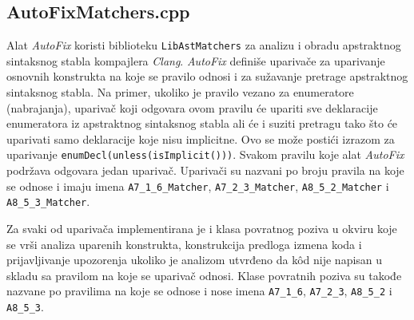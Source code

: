 \documentclass[12pt,oneside]{memoir}
\begin{document}
\subsection{AutoFixMatchers.cpp}
Alat \textit{AutoFix} koristi biblioteku \texttt{LibAstMatchers} za analizu i obradu apstraktnog sintaksnog stabla kompajlera \textit{Clang}. 
\textit{AutoFix} defini\v{s}e upariva\v{c}e za uparivanje osnovnih konstrukta na koje se pravilo odnosi i za su\v{z}avanje pretrage apstraktnog sintaksnog stabla. Na primer, ukoliko je pravilo vezano za enumeratore (nabrajanja), upariva\v{c} koji odgovara ovom pravilu \'{c}e upariti sve deklaracije enumeratora iz apstraktnog sintaksnog stabla ali \'{c}e i suziti pretragu tako \v{s}to \'{c}e uparivati samo deklaracije koje nisu implicitne. Ovo se mo\v{z}e posti\'{c}i izrazom za uparivanje \texttt{enumDecl(unless(isImplicit()))}. Svakom pravilu koje alat \textit{AutoFix} podr\v{z}ava odgovara jedan upariva\v{c}. Upariva\v{c}i su nazvani po broju pravila na koje se odnose i imaju imena
\texttt{A7\_1\_6\_Matcher}, \texttt{A7\_2\_3\_Matcher}, \texttt{A8\_5\_2\_Matcher} i \texttt{A8\_5\_3\_Matcher}.
\par
 Za svaki od upariva\v{c}a implementirana je i klasa povratnog poziva u okviru koje se vr\v{s}i analiza uparenih konstrukta, konstrukcija predloga izmena koda i prijavljivanje upozorenja ukoliko je analizom utvrđeno da k\^{o}d nije napisan u skladu sa pravilom na koje se upariva\v{c} odnosi. Klase
 povratnih poziva su takođe nazvane po pravilima na koje se odnose i nose imena \texttt{A7\_1\_6}, \texttt{A7\_2\_3}, \texttt{A8\_5\_2} i \texttt{A8\_5\_3}.
\end{document}

